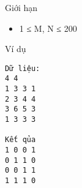 Giới hạn
\begin{itemize}
	\item     1 ≤ M, N ≤ 200   
\end{itemize}
Ví dụ
\begin{verbatim}
Dữ liệu:
4 4
1 3 3 1
2 3 4 4
3 6 5 3
1 3 3 3

Kết qủa
1 0 0 1
0 1 1 0
0 0 1 1
1 1 1 0
\end{verbatim}